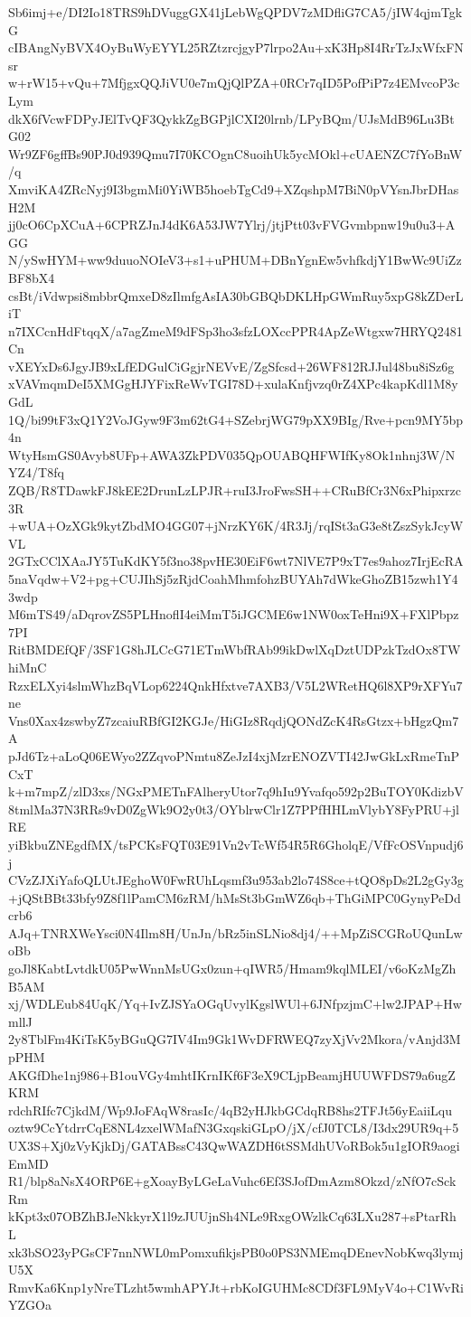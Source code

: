 Sb6imj+e/DI2Io18TRS9hDVuggGX41jLebWgQPDV7zMDfliG7CA5/jIW4qjmTgkG
cIBAngNyBVX4OyBuWyEYYL25RZtzrcjgyP7lrpo2Au+xK3Hp8I4RrTzJxWfxFNsr
w+rW15+vQu+7MfjgxQQJiVU0e7mQjQlPZA+0RCr7qID5PofPiP7z4EMvcoP3cLym
dkX6fVcwFDPyJElTvQF3QykkZgBGPjlCXI20lrnb/LPyBQm/UJsMdB96Lu3BtG02
Wr9ZF6gffBs90PJ0d939Qmu7I70KCOgnC8uoihUk5ycMOkl+cUAENZC7fYoBnW/q
XmviKA4ZRcNyj9I3bgmMi0YiWB5hoebTgCd9+XZqshpM7BiN0pVYsnJbrDHasH2M
jj0cO6CpXCuA+6CPRZJnJ4dK6A53JW7Ylrj/jtjPtt03vFVGvmbpnw19u0u3+AGG
N/ySwHYM+ww9duuoNOIeV3+s1+uPHUM+DBnYgnEw5vhfkdjY1BwWc9UiZzBF8bX4
csBt/iVdwpsi8mbbrQmxeD8zIlmfgAsIA30bGBQbDKLHpGWmRuy5xpG8kZDerLiT
n7IXCcnHdFtqqX/a7agZmeM9dFSp3ho3sfzLOXccPPR4ApZeWtgxw7HRYQ2481Cn
vXEYxDs6JgyJB9xLfEDGulCiGgjrNEVvE/ZgSfcsd+26WF812RJJul48bu8iSz6g
xVAVmqmDeI5XMGgHJYFixReWvTGI78D+xulaKnfjvzq0rZ4XPc4kapKdl1M8yGdL
1Q/bi99tF3xQ1Y2VoJGyw9F3m62tG4+SZebrjWG79pXX9BIg/Rve+pcn9MY5bp4n
WtyHsmGS0Avyb8UFp+AWA3ZkPDV035QpOUABQHFWIfKy8Ok1nhnj3W/NYZ4/T8fq
ZQB/R8TDawkFJ8kEE2DrunLzLPJR+ruI3JroFwsSH++CRuBfCr3N6xPhipxrzc3R
+wUA+OzXGk9kytZbdMO4GG07+jNrzKY6K/4R3Jj/rqISt3aG3e8tZszSykJcyWVL
2GTxCClXAaJY5TuKdKY5f3no38pvHE30EiF6wt7NlVE7P9xT7es9ahoz7IrjEcRA
5naVqdw+V2+pg+CUJIhSj5zRjdCoahMhmfohzBUYAh7dWkeGhoZB15zwh1Y43wdp
M6mTS49/aDqrovZS5PLHnoflI4eiMmT5iJGCME6w1NW0oxTeHni9X+FXlPbpz7PI
RitBMDEfQF/3SF1G8hJLCcG71ETmWbfRAb99ikDwlXqDztUDPzkTzdOx8TWhiMnC
RzxELXyi4slmWhzBqVLop6224QnkHfxtve7AXB3/V5L2WRetHQ6l8XP9rXFYu7ne
Vns0Xax4zswbyZ7zcaiuRBfGI2KGJe/HiGIz8RqdjQONdZcK4RsGtzx+bHgzQm7A
pJd6Tz+aLoQ06EWyo2ZZqvoPNmtu8ZeJzI4xjMzrENOZVTI42JwGkLxRmeTnPCxT
k+m7mpZ/zlD3xs/NGxPMETnFAlheryUtor7q9hIu9Yvafqo592p2BuTOY0KdizbV
8tmlMa37N3RRs9vD0ZgWk9O2y0t3/OYblrwClr1Z7PPfHHLmVlybY8FyPRU+jlRE
yiBkbuZNEgdfMX/tsPCKsFQT03E91Vn2vTcWf54R5R6GholqE/VfFcOSVnpudj6j
CVzZJXiYafoQLUtJEghoW0FwRUhLqsmf3u953ab2lo74S8ce+tQO8pDs2L2gGy3g
+jQStBBt33bfy9Z8f1lPamCM6zRM/hMsSt3bGmWZ6qb+ThGiMPC0GynyPeDdcrb6
AJq+TNRXWeYsci0N4Ilm8H/UnJn/bRz5inSLNio8dj4/++MpZiSCGRoUQunLwoBb
goJl8KabtLvtdkU05PwWnnMsUGx0zun+qIWR5/Hmam9kqlMLEI/v6oKzMgZhB5AM
xj/WDLEub84UqK/Yq+IvZJSYaOGqUvylKgslWUl+6JNfpzjmC+lw2JPAP+HwmllJ
2y8TblFm4KiTsK5yBGuQG7IV4Im9Gk1WvDFRWEQ7zyXjVv2Mkora/vAnjd3MpPHM
AKGfDhe1nj986+B1ouVGy4mhtIKrnIKf6F3eX9CLjpBeamjHUUWFDS79a6ugZKRM
rdchRIfc7CjkdM/Wp9JoFAqW8rasIc/4qB2yHJkbGCdqRB8hs2TFJt56yEaiiLqu
oztw9CcYtdrrCqE8NL4zxelWMafN3GxqskiGLpO/jX/cfJ0TCL8/I3dx29UR9q+5
UX3S+Xj0zVyKjkDj/GATABssC43QwWAZDH6tSSMdhUVoRBok5u1gIOR9aogiEmMD
R1/blp8aNsX4ORP6E+gXoayByLGeLaVuhc6Ef3SJofDmAzm8Okzd/zNfO7cSckRm
kKpt3x07OBZhBJeNkkyrX1l9zJUUjnSh4NLe9RxgOWzlkCq63LXu287+sPtarRhL
xk3bSO23yPGsCF7nnNWL0mPomxufikjsPB0o0PS3NMEmqDEnevNobKwq3lymjU5X
RmvKa6Knp1yNreTLzht5wmhAPYJt+rbKoIGUHMc8CDf3FL9MyV4o+C1WvRiYZGOa
